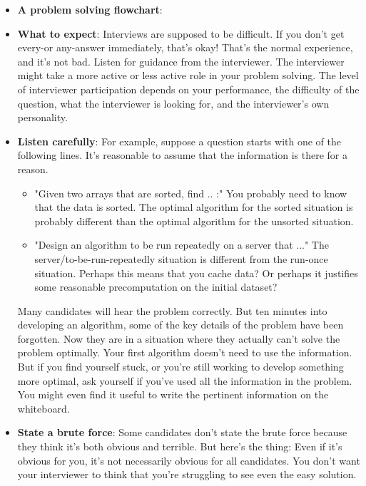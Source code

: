 \documentclass{report}
\begin{document}
\begin{itemize}
        \item \textbf{A problem solving flowchart}: 
            \bigbreak \noindent 
        \item \textbf{What to expect}: 
            Interviews are supposed to be difficult. If you don't get every-or any-answer immediately, that's okay! That's the normal experience, and it's not bad.
            \bigbreak \noindent 
            Listen for guidance from the interviewer. The interviewer might take a more active or less active role in your problem solving. The level of interviewer participation depends on your performance, the difficulty of the question, what the interviewer is looking for, and the interviewer's own personality.
        \item \textbf{Listen carefully}: For example, suppose a question starts with one of the following lines. It's reasonable to assume that the information is there for a reason.
            \begin{itemize}
                \item "Given two arrays that are sorted, find .. :"
                    \bigbreak \noindent 
                    You probably need to know that the data is sorted. The optimal algorithm for the sorted situation is probably different than the optimal algorithm for the unsorted situation.
                \item "Design an algorithm to be run repeatedly on a server that ..." 
                    \bigbreak \noindent 
                    The server/to-be-run-repeatedly situation is different from the run-once situation. Perhaps this means that you cache data? Or perhaps it justifies some reasonable precomputation on the initial dataset?
            \end{itemize}
            Many candidates will hear the problem correctly. But ten minutes into developing an algorithm, some of the key details of the problem have been forgotten. Now they are in a situation where they actually can't solve the problem optimally.
            \bigbreak \noindent 
            Your first algorithm doesn't need to use the information. But if you find yourself stuck, or you're still working
            \bigbreak \noindent 
            to develop something more optimal, ask yourself if you've used all the information in the problem. You might even find it useful to write the pertinent information on the whiteboard.
        \item \textbf{State a brute force}: 
            Some candidates don't state the brute force because they think it's both obvious and terrible. But here's the thing: Even if it's obvious for you, it's not necessarily obvious for all candidates. You don't want your interviewer to think that you're struggling to see even the easy solution.

\end{itemize}
\end{document}
